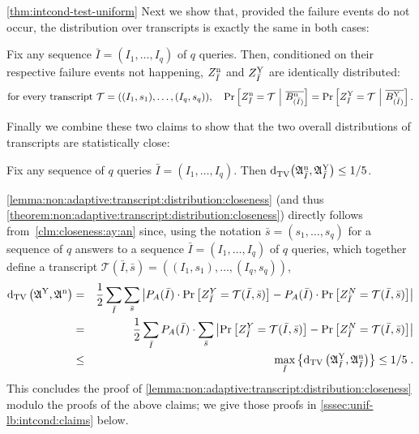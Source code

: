 \begin{proofof}{\cref{thm:intcond-test-uniform}}
Next we show that, provided the failure events do not occur,
the distribution over transcripts is exactly the same in both cases:

\begin{claim}\label{clm:cond:equality:in:law:ay:an}
Fix any sequence $\bar{I}=(I_1,\dots,I_q)$ of $q$
queries. Then, conditioned on their respective failure events not happening, $Z^{\rm n}_{\bar{I}}$ and $Z^{\rm Y}_{\bar{I}}$
are identically distributed:
\[\text{for every transcript~}\mathcal{T}=((I_1,s_1),\dots,(I_q,s_q)),
\quad \Pr\left[ Z^{\rm n}_{\bar{I}} = \mathcal{T}\ \Big|\
\overline{ B^{\rm n}_{(\bar{I})} } \right] = \Pr\left[ Z^{\rm Y}_{\bar{I}}
= \mathcal{T}\ \Big|\ \overline{ B^{\rm Y}_{(\bar{I})} } \right].  \]
\end{claim}
Finally we combine these two claims to show that the two overall distributions
of transcripts are statistically close:
\begin{claim}\label{clm:closeness:ay:an}
Fix any sequence of $q$ queries $\bar{I}=(I_1,\dots,I_q)$.
Then ${\operatorname{d}_{\rm{TV}}^{}\!\left({ \mathfrak{A}^{\rm n}_{\bar{I}} ,  \mathfrak{A}^{\rm Y}_{\bar{I}} }\right)} \leq 1/5$.
\end{claim}
\cref{lemma:non:adaptive:transcript:distribution:closeness}
(and thus
\cref{theorem:non:adaptive:transcript:distribution:closeness})
directly follows from~\cref{clm:closeness:ay:an} since, using
the notation \mbox{$\bar{s} = (s_1,\dots,s_q)$} for a sequence of $q$ answers
to a sequence $\bar{I} = (I_1,\dots,I_q)$ of $q$ queries, which
together define a transcript $\mathcal{T}(\bar{I},\bar{s}) = ((I_1,s_1),\dots,(I_q,s_q))$,
\begin{eqnarray}
  \operatorname{d}_{\rm{TV}}\left(\mathfrak{A}^{\rm Y},\mathfrak{A}^{\rm n}\right) &=& \frac{1}{2}    \sum_{\bar{I}}\sum_{\bar{s}}
      \left| P_A(\bar{I}) \cdot \Pr\left[Z^Y_{\bar{I}}=\mathcal{T}(\bar{I},\bar{s})\right] -
            P_A(\bar{I}) \cdot \Pr\left[Z^N_{\bar{I}}=\mathcal{T}(\bar{I},\bar{s})\right]\right| \nonumber\\
  &=& \frac{1}{2}\sum_{\bar{I}} P_A(\bar{I}) \cdot \sum_{\bar{s}}
     \left|  \Pr\left[Z^Y_{\bar{I}}=\mathcal{T}(\bar{I},\bar{s})\right]
           - \Pr\left[Z^N_{\bar{I}}=\mathcal{T}(\bar{I},\bar{s})\right]\right| \nonumber\\
  &\leq& \max_{\bar{I}}\left\{\operatorname{d}_{\rm{TV}}\left(\mathfrak{A}^{\rm Y}_{\bar{I}} , \mathfrak{A}^{\rm n}_{\bar{I}}\right) \right\}
    \leq 1/5\;.
\end{eqnarray}
\noindent
This concludes the proof of
\cref{lemma:non:adaptive:transcript:distribution:closeness}
modulo the proofs of the above claims; we give those proofs in
\cref{sssec:unif-lb:intcond:claims} below.


\end{proofof}
